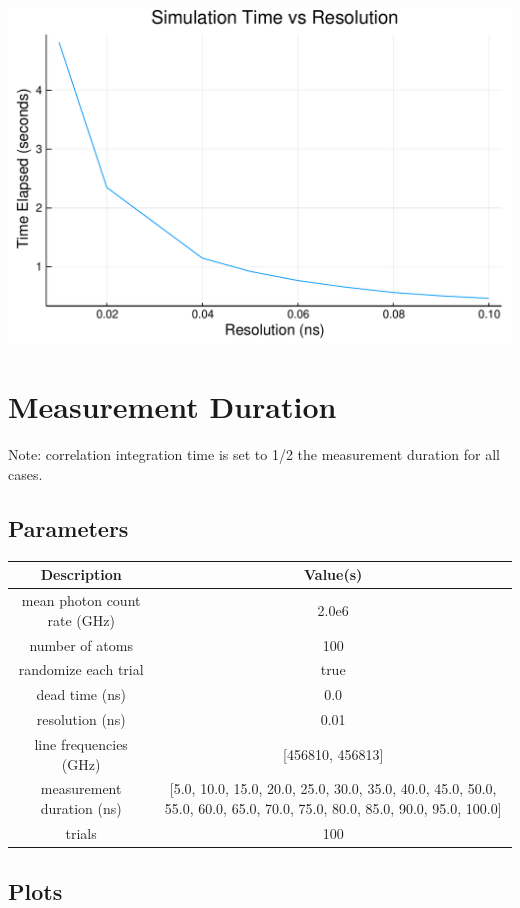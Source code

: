 \documentclass[12pt,a4paper]{article}
\begin{document}
\includegraphics[width=\linewidth]{jl_PKMVtA/simnb_10_1.pdf}

\section{Measurement Duration}
Note: correlation integration time is set to 1/2 the measurement duration for all cases.



\subsection{Parameters}
\begin{tabular}
{c | c}
Description & Value(s) \\
\hline
mean photon count rate (GHz) & 2.0e6 \\
number of atoms & 100 \\
randomize each trial & true \\
dead time (ns) & 0.0 \\
resolution (ns) & 0.01 \\
line frequencies (GHz) & [456810, 456813] \\
measurement duration (ns) & [5.0, 10.0, 15.0, 20.0, 25.0, 30.0, 35.0, 40.0, 45.0, 50.0, 55.0, 60.0, 65.0, 70.0, 75.0, 80.0, 85.0, 90.0, 95.0, 100.0] \\
trials & 100 \\
\end{tabular}
\subsection{Plots}
\end{document}

